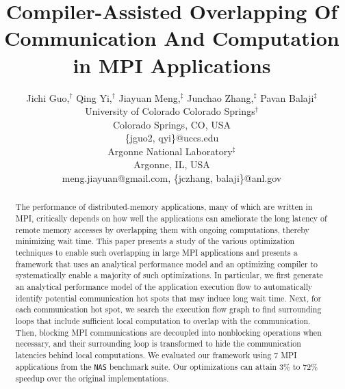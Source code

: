 \documentclass[10pt,doublecolumn,conference]{IEEEtran}
\begin{document}
%
%
\title{Compiler-Assisted Overlapping Of Communication And Computation in MPI Applications}

\author{Jichi Guo,$^\dag$ Qing Yi,$^\dag$ Jiayuan Meng,$^\ddag$ Junchao Zhang,$^\ddag$ Pavan Balaji$^\ddag$\\
University of Colorado Colorado Springs$^\dag$\\
Colorado Springs, CO, USA\\
\{jguo2, qyi\}@uccs.edu \\
Argonne National Laboratory$^\ddag$\\
Argonne, IL, USA\\
meng.jiayuan@gmail.com, \{jczhang, balaji\}@anl.gov
}

\maketitle

\begin{abstract}
The performance of distributed-memory applications, many of which are
written in MPI, critically depends on how well the applications can
ameliorate the long latency of remote memory accesses by overlapping
them with ongoing computations, thereby minimizing wait time.  This
paper presents a study of the various optimization techniques to
enable such overlapping in large MPI applications and presents a
framework that uses an analytical performance model and an optimizing compiler
to systematically enable a majority of such optimizations.  In particular, we first generate an
analytical performance model of the application execution flow to automatically identify potential communication hot spots
that may induce long wait time.  Next, for each communication hot
spot, we search the execution flow graph to find surrounding loops that
include sufficient local computation to overlap with the
communication.  Then, blocking MPI communications are decoupled into
nonblocking operations when necessary, and their surrounding loop is
transformed to hide the communication latencies behind local
computations.  We evaluated our framework using 7 MPI applications
from the \texttt{NAS} benchmark suite.  Our optimizations can attain
3\% to 72\% speedup over the original implementations.
\end{abstract}


\end{document}
